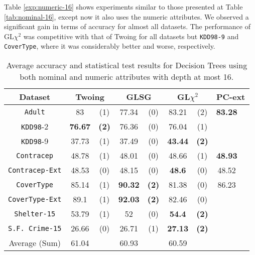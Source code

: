 Table \ref{exp:numeric-16}
shows experiments  similar to those presented at Table \ref{tab:nominal-16}, except now it also uses the numeric attributes.
We observed a significant gain in terms of accuracy for almost all datasets. 
The performance of GL$\chi^2$ was competitive with that of Twoing for all datasets but {\tt KDD98-9} and {\tt CoverType}, where it was
considerably better and worse, respectively.


\begin{table}
\small
\caption{Average accuracy and statistical test results for  Decision Trees using both nominal and numeric attributes with depth at most 16.}
\centering
\begin{tabular}{c|cc|cc|cc|cc} 
Dataset              &        \multicolumn{2}{c|}{Twoing} &   \multicolumn{2}{c|}{GLSG} &   \multicolumn{2}{c|}{GL$\chi^2$} & \multicolumn{2}{c}{PC-ext}  \\  \hline   
{\tt Adult}          &  83            &  (1)              &  77.34      &  (0)          &  83.21       &  (2)               & {\bf 83.28} &               \\
{\tt KDD98}-2        &  {\bf 76.67}   &  {\bf (2)}        &  76.36      &  (0)          &  76.04       &  (1)               &             &               \\
{\tt KDD98}-9        &  37.73         &  (1)              &  37.49      &  (0)          &  {\bf 43.44} &  {\bf (2)}         &             &               \\
{\tt Contracep}      &  48.78         &  (1)              &  48.01      &  (0)          &  48.66       &  (1)               & {\bf 48.93} &               \\
{\tt Contracep-Ext}  &  48.53         &  (0)              &  48.15      &  (0)          &  {\bf 48.6}  &  (0)               &  48.52      &               \\
{\tt CoverType}      &  85.14         &  (1)              &  {\bf 90.32}&  {\bf (2)}    &  81.38       &  (0)               &  86.23      &               \\
{\tt CoverType-Ext}  &  89.1          &  (1)              &  {\bf 92.03}&  {\bf (2)}    &  82.46       &  (0)               &             &               \\
{\tt Shelter-15}     &  53.79         &  (1)              &  52         &  (0)          &  {\bf 54.4}  &  {\bf (2)}         &             &               \\   
{\tt S.F. Crime-15}  &  26.66         &  (0)              &  26.71      &  (1)          &  {\bf 27.13} &  {\bf (2)}         &             &               \\
\hline
Average (Sum)        &   61.04        &                   & 60.93       &               &   60.59      &                    &             &


\end{tabular}
\end{table}
